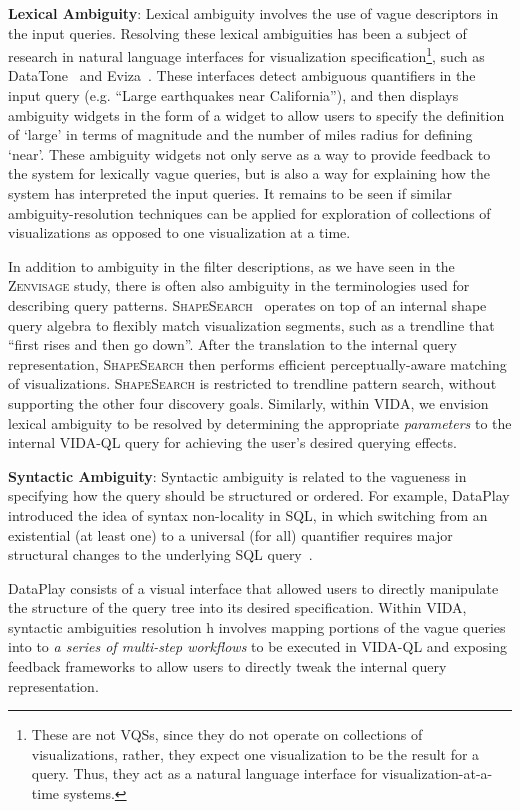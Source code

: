 \documentclass[11pt]{article}
\newcommand{\techreport}[1]{}
\newcommand{\stitle}[1]{\par\noindent\textbf{#1}}
\newcommand{\zv}{\textsc{Zenvisage}\xspace}
\newcommand{\vida}{\textsc{VIDA}\xspace}
\newcommand{\vidaql}{\textsc{VIDA-QL}\xspace}
\newcommand{\ssearch}{\textsc{ShapeSearch}\xspace}
\begin{document}
\stitle{Lexical Ambiguity}: 
Lexical ambiguity involves the use of 
vague descriptors in the input queries. 
Resolving these lexical ambiguities 
has been a subject of research in 
natural language interfaces for 
visualization specification\footnote{These are not VQSs, since
they do not operate on collections of visualizations,
rather, they expect one visualization to be the result for a query. Thus,
they act as a natural language interface for visualization-at-a-time systems.}, 
such as DataTone~\cite{Gao2015} and Eviza~\cite{Setlur2016}. 
These interfaces detect ambiguous quantifiers 
in the input query (e.g. ``Large earthquakes near California''), 
and then displays ambiguity widgets 
in the form of a widget to allow users 
to specify the definition of `large' 
in terms of magnitude and the number of miles 
radius for defining 
`near'\techreport{, as shown in Figure~\ref{fig:ambiguity}a}. 
These ambiguity widgets not only serve as a 
way to provide feedback to the system for 
lexically vague queries, 
but is also a way for explaining 
how the system has interpreted the input queries. 
It remains to be seen if similar ambiguity-resolution techniques
can be applied for exploration of collections of
visualizations as opposed to one visualization at a time.

In addition to ambiguity in the filter descriptions, 
as we have seen in the \zv study, 
there is often also ambiguity in the terminologies 
used for describing query patterns. 
\ssearch~\cite{Siddiqui2018} operates 
on top of an internal shape query algebra 
to flexibly match visualization segments, 
such as a trendline that ``first rises and then go down''. 
After the translation to the 
internal query representation, 
\ssearch then performs efficient 
perceptually-aware matching of visualizations. 
\ssearch is restricted to trendline pattern
search, without supporting the other four discovery goals.
Similarly, within \vida , 
we envision lexical ambiguity to be 
resolved by determining the 
appropriate \textit{parameters} 
to the internal \vidaql query for 
achieving the user's desired querying effects.

\stitle{Syntactic Ambiguity}: 
Syntactic ambiguity is related to the 
vagueness in specifying how the 
query should be structured or ordered. 
For example, DataPlay introduced 
the idea of syntax non-locality in SQL, 
in which switching from an existential 
(at least one) to a universal (for all) 
quantifier requires major structural changes 
to the underlying SQL query~\cite{Abouzied2012}. 
\techreport{As shown in Figure~\ref{fig:ambiguity}b, }
DataPlay consists of a visual interface 
that allowed users to directly manipulate 
the structure of the query tree into 
its desired specification. 
Within \vida, syntactic ambiguities resolution  h
involves mapping portions of the vague queries 
into to \textit{a series of multi-step workflows} 
to be executed in \vidaql and exposing feedback 
frameworks to allow users to directly tweak 
the internal query representation. 
\end{document}
